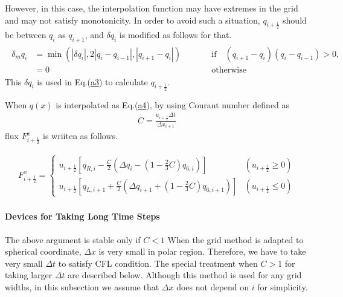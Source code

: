 However, in this case, the interpolation function may have extremes in the grid and may not satisfy monotonicity. In order to avoid such a situation, \(q_{i+\frac{1}{2}}\) should be between \(q_{i}\)
as \(q_{i+1}\), and \(\delta q_{i}\) is modified as follows for that. \begin{eqnarray}
\begin{aligned}
\delta_{m} q_{i} & =\min(|\delta
q_{i}|,2|q_{i}-q_{i-1}|,|q_{i+1}-q_{i}|) && \qquad \text{if$\quad(q_{i+1}-q_{i})(q_{i}-q_{i-1}) >0$}, \\
& =0 && \qquad \text{otherwise}
\end{aligned}
\end{eqnarray} This \(\delta q_{i}\) is used in Eq.(\url{a3}) to calculate \(q_{i+\frac{1}{2}}\).

When \(q(x)\) is interpolated as Eq.(\url{a4}), by using Courant number defined as \begin{eqnarray}
C=\frac{u_{i+\frac{1}{2}}\Delta t}{\Delta x_{i+1}}\end{eqnarray} flux \(F^{x}_{i+\frac{1}{2}}\) is wriiten as follows.

\begin{eqnarray}
F^{x}_{i+\frac{1}{2}}=\begin{cases}u_{i+\frac{1}{2}}[q_{R,i}-\frac{C}{2}(\Delta q_{i}-(1-\frac{2}{3}C)q_{6,i})] & (u_{i+\frac{1}{2}}\ge0)\\
  u_{i+\frac{1}{2}}[q_{L,i+1}+\frac{C}{2}(\Delta q_{i+1}+(1-\frac{2}{3}C)q_{6,i+1})] & (u_{i+\frac{1}{2}}\leq0)
  \end{cases}
\end{eqnarray}

\hypertarget{devices-for-taking-long-time-steps}{%
\paragraph{Devices for Taking Long Time Steps}\label{devices-for-taking-long-time-steps}}

The above argument is stable only if \(C<1\) When the grid method is adapted to spherical coordinate, \(\Delta x\) is very small in polar region. Therefore, we have to take very small \(\Delta t\) to
satisfy CFL condition. The special treatment when \(C>1\) for taking larger \(\Delta t\) are described below. Although this method is used for any grid widths, in this subsection we assume that
\(\Delta x\) does not depend on \(i\) for simplicity.

